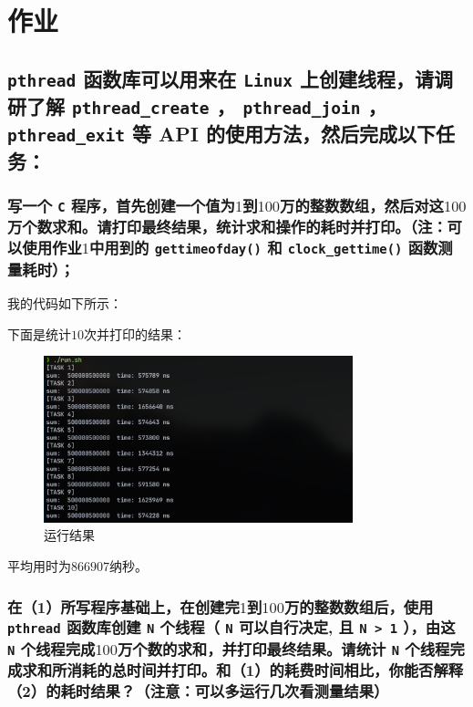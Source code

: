 \section{作业}

\subsection{
    {\tt pthread} 函数库可以用来在 {\tt Linux} 上创建线程，请调研了解 {\tt pthread_create} ， {\tt pthread_join} ， {\tt pthread_exit} 等 API 的使用方法，然后完成以下任务：
}

\subsubsection{
    写一个 {\tt C} 程序，首先创建一个值为$1$到$100$万的整数数组，然后对这$100$万个数求和。请打印最终结果，统计求和操作的耗时并打印。（注：可以使用作业$1$中用到的 {\tt gettimeofday()} 和 {\tt clock_gettime()} 函数测量耗时）；
}

我的代码如下所示：



下面是统计$10$次并打印的结果：

\begin{figure}[H]
    \centering
    \includegraphics[width=0.8\textwidth]{fig/prog1.png}
    \caption{运行结果}
\end{figure}

平均用时为$866907$纳秒。

\subsubsection{
    在（1）所写程序基础上，在创建完$1$到$100$万的整数数组后，使用 {\tt pthread} 函数库创建 {\tt N} 个线程（ {\tt N} 可以自行决定, 且 {\tt N > 1} ），由这 {\tt N} 个线程完成$100$万个数的求和，并打印最终结果。请统计 {\tt N} 个线程完成求和所消耗的总时间并打印。和（1）的耗费时间相比，你能否解释（2）的耗时结果？（注意：可以多运行几次看测量结果）
}

